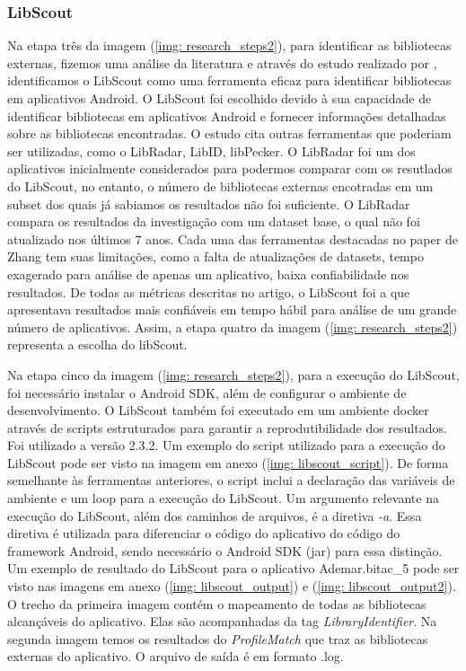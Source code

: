 \subsubsection{LibScout}

Na etapa três da imagem (\ref{img: research_steps2}), para identificar as bibliotecas externas, fizemos uma análise da literatura e através do estudo realizado por \cite{api_tpl_zhang}, identificamos o LibScout como uma ferramenta eficaz para identificar bibliotecas em aplicativos Android. O LibScout foi escolhido devido à sua capacidade de identificar bibliotecas em aplicativos Android e fornecer informações detalhadas sobre as bibliotecas encontradas. O estudo cita outras ferramentas que poderiam ser utilizadas, como o LibRadar, LibID, libPecker. O LibRadar foi um dos aplicativos inicialmente considerados para podermos comparar com os resutlados do LibScout, no entanto, o número de bibliotecas externas encotradas em um subset dos quais já sabiamos os resultados não foi suficiente. O LibRadar compara os resultados da investigação com um dataset base, o qual não foi atualizado nos últimos 7 anos. Cada uma das ferramentas destacadas no paper de Zhang tem suas limitações, como a falta de atualizações de datasets, tempo exagerado para análise de apenas um aplicativo, baixa confiabilidade nos resultados. De todas as métricas descritas no artigo, o LibScout foi a que apresentava resultados mais confiáveis em tempo hábil para análise de um grande número de aplicativos. Assim, a etapa quatro da imagem (\ref{img: research_steps2}) representa a escolha do libScout. 

Na etapa cinco da imagem (\ref{img: research_steps2}), para a execução do LibScout, foi necessário instalar o Android SDK, além de configurar o ambiente de desenvolvimento. O LibScout também foi executado em um ambiente docker através de scripts estruturados para garantir a reprodutibilidade dos resultados. Foi utilizado a versão 2.3.2. Um exemplo do script utilizado para a execução do LibScout pode ser visto na imagem em anexo (\ref{img: libscout_script}). De forma semelhante às ferramentas anteriores, o script inclui a declaração das variáveis de ambiente e um loop para a execução do LibScout. Um argumento relevante na execução do LibScout, além dos caminhos de arquivos, é a diretiva \textit{-a}. Essa diretiva é utilizada para diferenciar o código do aplicativo do código do framework Android, sendo necessário o Android SDK (jar) para essa distinção. Um exemplo de resultado do LibScout para o aplicativo Ademar.bitac\_5 pode ser visto nas imagens em anexo (\ref{img: libscout_output}) e (\ref{img: libscout_output2}). O trecho da primeira imagem contém o mapeamento de todas as bibliotecas alcançáveis do aplicativo. Elas são acompanhadas da tag \textit{LibraryIdentifier}. Na segunda imagem temos os resultados do \textit{ProfileMatch} que traz as bibliotecas externas do aplicativo. O arquivo de saída é em formato .log. 

